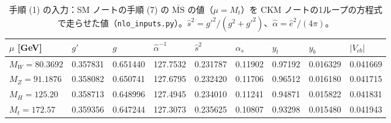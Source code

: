 \documentclass[a4paper,10pt]{ltjsarticle}
\newcommand{\MSbar}{\overline{\mathrm{MS}}}
\begin{document}
\begin{table}[tbp]
\centering\small
\caption{手順 (1) の入力：SM ノートの手順 (7) の $\MSbar$ の値（$\mu=M_t$）を CKM ノートの1ループの方程式で走らせた値（\texttt{nlo\_inputs.py}）。$\hat s^2=g'^2/(g^2+g'^2)$、$\hat\alpha=\hat e^2/(4\pi)$。}
\label{tab:lopar}
\begin{tabular}{lllllllll}
\toprule
$\mu$ [GeV] & $g'$ & $g$ & $\hat\alpha^{-1}$ & $\hat s^2$ & $\alpha_s$ & $y_t$ & $y_b$ & $|V_{cb}|$ \\
\midrule
$M_W=80.3692$ & 0.357831 & 0.651440 & 127.7532 & 0.231787 & 0.11902 & 0.97192 & 0.016329 & 0.041669 \\
$M_Z=91.1876$ & 0.358082 & 0.650741 & 127.6795 & 0.232420 & 0.11706 & 0.96512 & 0.016180 & 0.041715 \\
$M_H=125.20$ & 0.358713 & 0.648996 & 127.4945 & 0.234010 & 0.11241 & 0.94871 & 0.015822 & 0.041831 \\
$M_t=172.57$ & 0.359356 & 0.647244 & 127.3073 & 0.235625 & 0.10807 & 0.93298 & 0.015480 & 0.041943 \\
\bottomrule
\end{tabular}
\end{table}
\end{document}
